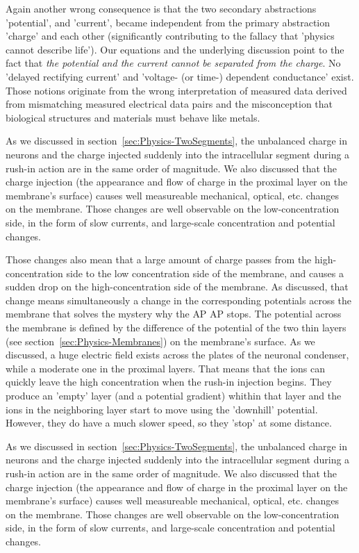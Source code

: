 Again another wrong consequence is that the two secondary abstractions 'potential',
and 'current', became independent from the primary abstraction 'charge'
and each other (significantly contributing to the fallacy that 'physics cannot describe life'). Our equations and the underlying discussion point
to the fact that \emph{the potential and the current cannot be separated
from the charge}. No 'delayed rectifying current' and 'voltage- (or
time-) dependent conductance' exist. Those notions originate from
the wrong interpretation of measured data derived from mismatching
measured electrical data pairs and the misconception that biological
structures and materials must behave like metals.
\fi

\ifx\magyar\undefined
As we discussed in section~\ref{sec:Physics-TwoSegments}, 
the unbalanced charge in neurons and the charge injected
suddenly into the intracellular segment during a rush-in action
are in the same order of magnitude. We also discussed that 
the charge injection (the appearance and flow of charge in the proximal layer on the membrane's surface) causes well measureable mechanical, optical, etc. changes~\cite{MechanicalWaves:2015} on the membrane.
Those changes are well observable on the low-concentration side, in the form of slow currents, and large-scale
concentration and potential changes.

Those changes also mean that a large amount of charge
passes from the high-concentration side
to the low concentration side of the membrane, and causes a sudden drop
on the high-concentration side of the membrane. As discussed,
that change means simultaneously a change in the corresponding 
potentials across the membrane that solves the mystery why the
\gls{AP}
AP stops. The potential across the membrane is defined by the difference of the
potential of the two thin layers (see section~\ref{sec:Physics-Membranes}) on the membrane's surface.
As we discussed, a huge electric field exists across the
plates of the neuronal condenser, while a moderate one 
in the proximal layers. That means that the ions can quickly
leave the high concentration when the rush-in injection begins.
They produce an 'empty' layer (and a potential gradient)
whithin that layer and the ions in the neighboring layer
start to move using the 'downhill' potential. However, they do have a much slower speed, so they 'stop' at some distance. 


\else

As we discussed in section~\ref{sec:Physics-TwoSegments}, 
the unbalanced charge in neurons and the charge injected
suddenly into the intracellular segment during a rush-in action
are in the same order of magnitude. We also discussed that 
the charge injection (the appearance and flow of charge in the proximal layer on the membrane's surface) causes well measureable mechanical, optical, etc. changes~\cite{MechanicalWaves:2015} on the membrane.
Those changes are well observable on the low-concentration side, in the form of slow currents, and large-scale
concentration and potential changes.


